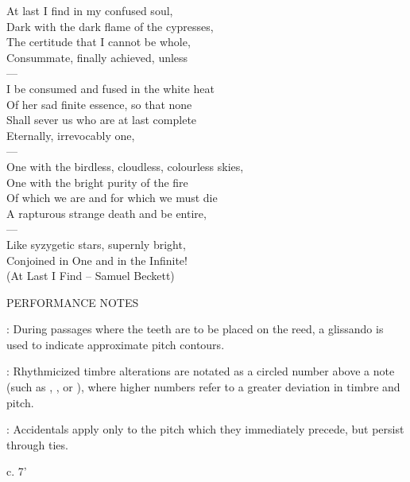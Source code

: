 \documentclass[11pt]{article}
\newcommand*\circled[1]{\tikz[baseline=(char.base)]{
            \node[shape=circle,draw,inner sep=1pt] (char) {#1};}}
\begin{document}
\begingroup
\begin{center}
At last I find in my confused soul, \\
Dark with the dark flame of the cypresses, \\
The certitude that I cannot be whole, \\
Consummate, finally achieved, unless \\
 ---\\
I be consumed and fused in the white heat \\
Of her sad finite essence, so that none \\
Shall sever us who are at last complete \\
Eternally, irrevocably one, \\
 ---\\
One with the birdless, cloudless, colourless skies, \\
One with the bright purity of the fire \\
Of which we are and for which we must die \\
A rapturous strange death and be entire, \\
 ---\\
Like syzygetic stars, supernly bright, \\
Conjoined in One and in the Infinite! \\
\rightskip\leftskip
\phantom{text} \hfill (At Last I Find -- Samuel Beckett)
\end{center}
\endgroup

\vspace*{2\baselineskip}

\begin{center}
\huge PERFORMANCE NOTES
\end{center}
\begingroup
\begin{center}

 : During passages where the teeth are to be placed on the reed, a glissando is used to indicate approximate pitch contours.
\rightskip\leftskip
\phantom{text} \hfill \phantom{()}


 : Rhythmicized timbre alterations are notated as a circled number above a note (such as \circled{1}, \circled{2}, or \circled{3}), where higher numbers refer to a greater deviation in timbre and pitch.
\rightskip\leftskip
\phantom{text} \hfill \phantom{()}

 : Accidentals apply only to the pitch which they immediately precede, but persist through ties.
\rightskip\leftskip
\phantom{text} \hfill \phantom{()}
\end{center}
\endgroup

\vspace*{36\baselineskip}

\begin{center}
c. 7'
\end{center}
\end{document}
